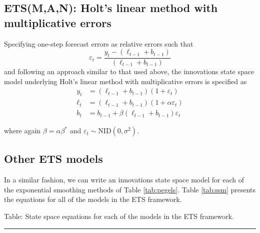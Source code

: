 \documentclass[]{book}
\begin{document}
\hypertarget{etsman-holts-linear-method-with-multiplicative-errors}{%
\subsection*{ETS(M,A,N): Holt's linear method with multiplicative errors}\label{etsman-holts-linear-method-with-multiplicative-errors}}

Specifying one-step forecast errors as relative errors such that
\[
  \varepsilon_t=\frac{y_t-(\ell_{t-1}+b_{t-1})}{(\ell_{t-1}+b_{t-1})}
\]
and following an approach similar to that used above, the innovations state space model underlying Holt's linear method with multiplicative errors is specified as
\begin{align*}
y_t&=(\ell_{t-1}+b_{t-1})(1+\varepsilon_t)\\
\ell_t&=(\ell_{t-1}+b_{t-1})(1+\alpha \varepsilon_t)\\
b_t&=b_{t-1}+\beta(\ell_{t-1}+b_{t-1}) \varepsilon_t
\end{align*}

where again \(\beta=\alpha \beta^*\) and \(\varepsilon_t \sim \text{NID}(0,\sigma^2)\).

\hypertarget{other-ets-models}{%
\subsection*{Other ETS models}\label{other-ets-models}}

In a similar fashion, we can write an innovations state space model for each of the exponential smoothing methods of Table \ref{tab:pegels}. Table \ref{tab:ssm} presents the equations for all of the models in the ETS framework.

Table: \label{tab:ssm} State space equations for each of the models in the ETS framework.

\begin{center}\rule{0.5\linewidth}{\linethickness}\end{center}
\end{document}
